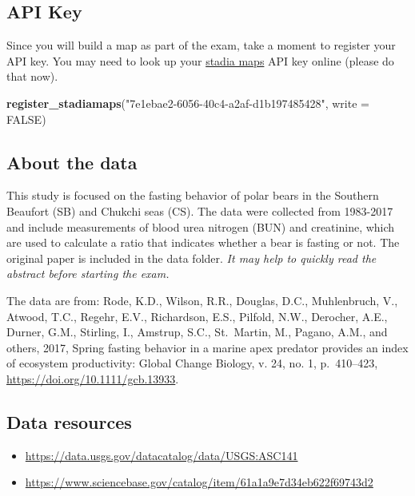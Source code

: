 \documentclass[
]{article}
\newenvironment{Shaded}{\begin{snugshade}}{\end{snugshade}}
\newcommand{\AttributeTok}[1]{\textcolor[rgb]{0.13,0.29,0.53}{#1}}
\newcommand{\ConstantTok}[1]{\textcolor[rgb]{0.56,0.35,0.01}{#1}}
\newcommand{\FunctionTok}[1]{\textcolor[rgb]{0.13,0.29,0.53}{\textbf{#1}}}
\newcommand{\NormalTok}[1]{#1}
\newcommand{\StringTok}[1]{\textcolor[rgb]{0.31,0.60,0.02}{#1}}
\providecommand{\tightlist}{%
  \setlength{\itemsep}{0pt}\setlength{\parskip}{0pt}}
\begin{document}
\subsection{API Key}\label{api-key}

Since you will build a map as part of the exam, take a moment to
register your API key. You may need to look up your
\href{https://client.stadiamaps.com/dashboard/overview}{stadia maps} API
key online (please do that now).

\begin{Shaded}
\begin{Highlighting}[]
\FunctionTok{register\_stadiamaps}\NormalTok{(}\StringTok{"7e1ebae2{-}6056{-}40c4{-}a2af{-}d1b197485428"}\NormalTok{, }\AttributeTok{write =} \ConstantTok{FALSE}\NormalTok{)}
\end{Highlighting}
\end{Shaded}

\subsection{About the data}\label{about-the-data}

This study is focused on the fasting behavior of polar bears in the
Southern Beaufort (SB) and Chukchi seas (CS). The data were collected
from 1983-2017 and include measurements of blood urea nitrogen (BUN) and
creatinine, which are used to calculate a ratio that indicates whether a
bear is fasting or not. The original paper is included in the data
folder. \emph{It may help to quickly read the abstract before starting
the exam.}

The data are from: Rode, K.D., Wilson, R.R., Douglas, D.C., Muhlenbruch,
V., Atwood, T.C., Regehr, E.V., Richardson, E.S., Pilfold, N.W.,
Derocher, A.E., Durner, G.M., Stirling, I., Amstrup, S.C., St.~Martin,
M., Pagano, A.M., and others, 2017, Spring fasting behavior in a marine
apex predator provides an index of ecosystem productivity: Global Change
Biology, v. 24, no. 1, p.~410--423,
\url{https://doi.org/10.1111/gcb.13933}.

\subsection{Data resources}\label{data-resources}

\begin{itemize}
\tightlist
\item
  \url{https://data.usgs.gov/datacatalog/data/USGS:ASC141}
\item
  \url{https://www.sciencebase.gov/catalog/item/61a1a9e7d34eb622f69743d2}
\end{itemize}
\end{document}
